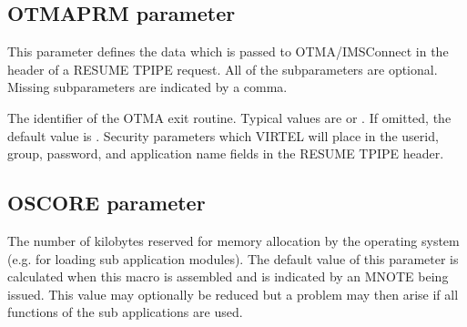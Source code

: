 \documentclass[letterpaper,10pt,english]{sphinxmanual}
\begin{document}
\subsection{OTMAPRM parameter}
\label{\detokenize{Installation_Guide:otmaprm-parameter}}\label{\detokenize{Installation_Guide:index-98}}
\begin{sphinxVerbatim}[commandchars=\\\{\}]
 
\end{sphinxVerbatim}

\sphinxAtStartPar
This parameter defines the data which is passed to OTMA/IMSConnect in the header of a RESUME TPIPE request. All of the subparameters are optional. Missing subparameters are indicated by a comma.

\sphinxAtStartPar
{} \sphinxhyphen{} The identifier of the OTMA exit routine. Typical values are  or . If omitted, the default value is .
 \sphinxhyphen{} Security parameters which VIRTEL will place in the userid, group, password, and application name fields in the RESUME TPIPE header.

\ignorespaces 

\subsection{OSCORE parameter}
\label{\detokenize{Installation_Guide:oscore-parameter}}\label{\detokenize{Installation_Guide:index-99}}
\begin{sphinxVerbatim}[commandchars=\\\{\}]
 
\end{sphinxVerbatim}

\sphinxAtStartPar
{} \sphinxhyphen{} The number of kilobytes reserved for memory allocation by the operating system (e.g. for loading sub application modules). The default value of this parameter is calculated when this macro is assembled and is indicated by an MNOTE being issued. This value may optionally be reduced but a problem may then arise if all functions of the sub applications are used.
\end{document}

